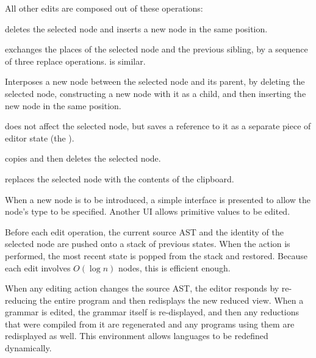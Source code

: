 All other edits are composed out of these operations:

 deletes the selected node and inserts a new node in the same position.

 exchanges the places of the selected node and the previous sibling, by a sequence of three replace operations.  is similar.

 Interposes a new node between the selected node and its parent, by deleting the selected node, constructing a new node with it as a child, and then inserting the new node in the same position.



 does not affect the selected node, but saves a reference to it as a separate piece of editor state (the ).

 copies and then deletes the selected node.

 replaces the selected node with the contents of the clipboard.

When a new node is to be introduced, a simple interface is presented to allow the node's type to be specified. Another UI allows primitive values to be edited.

Before each edit operation, the current source AST and the identity of the selected node are pushed onto a stack of previous states. When the  action is performed, the most recent state is popped from the stack and restored. Because each edit involves $O(\log n)$ nodes, this is efficient enough.

When any editing action changes the source AST, the editor responds by re-reducing the entire program and then redisplays the new reduced view. When a grammar is edited, the grammar itself is re-displayed, and then any reductions that were compiled from it are regenerated and any programs using them are redisplayed as well. This environment allows languages to be redefined dynamically.


